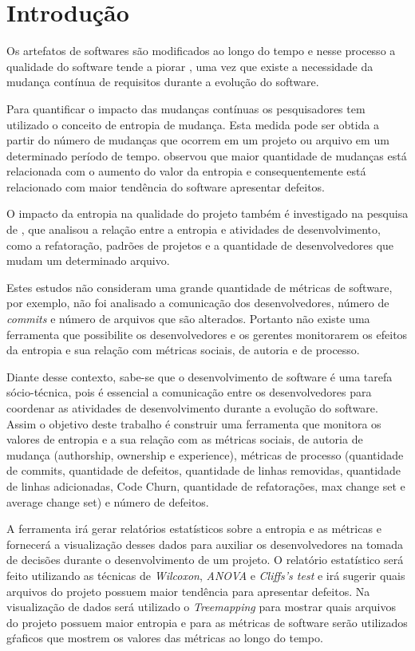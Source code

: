 \chapter{Introdução}

Os artefatos de softwares são modificados ao longo do tempo e nesse processo a qualidade do software tende a piorar \cite{Hassan:2009:PFU:1555001.1555024}, uma vez que existe a necessidade da mudança contínua de requisitos durante a evolução do software.

Para quantificar o impacto das mudanças contínuas os pesquisadores \cite{Hassan:2009:PFU:1555001.1555024}  tem utilizado o conceito de entropia de mudança. Esta medida pode ser obtida a partir do número de mudanças que ocorrem em um projeto ou arquivo em um determinado período de tempo.  observou que maior quantidade de mudanças está relacionada com o aumento do valor da entropia e consequentemente está relacionado com maior tendência do software apresentar defeitos. 

O impacto da entropia na qualidade do projeto também é investigado na pesquisa de , que analisou a relação entre a entropia e atividades de desenvolvimento, como a refatoração, padrões de projetos e a quantidade de desenvolvedores que mudam um determinado arquivo.

Estes estudos não consideram uma grande quantidade de métricas de software, por exemplo, não foi analisado a comunicação dos desenvolvedores, número de \textit{commits} e número de arquivos que são alterados. Portanto não existe uma ferramenta que possibilite os desenvolvedores e os gerentes monitorarem os efeitos da entropia e sua relação com métricas sociais, de autoria e de processo.

Diante desse contexto, sabe-se que o desenvolvimento de software é uma tarefa sócio-técnica, pois é essencial a comunicação entre os desenvolvedores para coordenar as atividades de desenvolvimento durante a evolução do software. Assim o objetivo deste trabalho é construir uma ferramenta que monitora os valores de entropia e a sua relação com as métricas sociais, de autoria de mudança (authorship, ownership e experience), métricas de processo (quantidade de commits, quantidade de defeitos, quantidade de linhas removidas, quantidade de linhas adicionadas, Code Churn, quantidade de refatorações, max change set e average change set) e número de defeitos.

A ferramenta irá gerar relatórios estatísticos sobre a entropia e as métricas e fornecerá a visualização desses dados para auxiliar os desenvolvedores na tomada de decisões durante o desenvolvimento de um projeto. O relatório estatístico será feito utilizando as técnicas de \textit{Wilcoxon}, \textit{ANOVA} e \textit{Cliffs's test} e irá sugerir quais arquivos do projeto possuem maior tendência para apresentar defeitos. Na visualização de dados será utilizado o \textit{Treemapping} para  mostrar quais arquivos do projeto possuem maior entropia e para as métricas de software serão utilizados gŕaficos que mostrem os valores das métricas ao longo do tempo.

